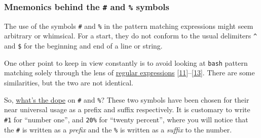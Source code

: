\documentclass[
  a4paper,
]{article}
\newenvironment{Shaded}{\begin{snugshade}}{\end{snugshade}}
\newcommand{\BuiltInTok}[1]{\textcolor[rgb]{0.80,0.80,0.80}{#1}}
\newcommand{\CommentTok}[1]{\textcolor[rgb]{0.50,0.62,0.50}{#1}}
\newcommand{\NormalTok}[1]{\textcolor[rgb]{0.80,0.80,0.80}{#1}}
\newcommand{\OperatorTok}[1]{\textcolor[rgb]{0.94,0.94,0.82}{#1}}
\newcommand{\PreprocessorTok}[1]{\textcolor[rgb]{1.00,0.81,0.69}{\textbf{#1}}}
\newcommand{\StringTok}[1]{\textcolor[rgb]{0.80,0.58,0.58}{#1}}
\newcommand{\VariableTok}[1]{\textcolor[rgb]{0.80,0.80,0.80}{#1}}
\begin{document}
\begin{Shaded}
\end{Shaded}

\hypertarget{mnemonics-behind-the-and-symbols}{%
\subsubsection{\texorpdfstring{Mnemonics behind the \texttt{\#} and
\texttt{\%}
symbols}{Mnemonics behind the \# and \% symbols}}\label{mnemonics-behind-the-and-symbols}}

The use of the symbols \texttt{\#} and \texttt{\%} in the pattern
matching expressions might seem arbitrary or whimsical. For a start,
they do not conform to the usual delimiters \texttt{\^{}} and
\texttt{\$} for the beginning and end of a line or string.

One other point to keep in view constantly is to avoid looking at
\texttt{bash} pattern matching solely through the lens of
\href{https://www.regular-expressions.info/tutorial.html}{regular
expressions}
\protect\hyperlink{ref-posixcharclass}{{[}11{]}}--\protect\hyperlink{ref-writeregexp}{{[}13{]}}.
There are some similarities, but the two are not identical.

So,
\href{https://www.ldoceonline.com/dictionary/the-dope-on-somebody-something}{what's
the dope} on \texttt{\#} and \texttt{\%}? These two symbols have been
chosen for their near universal usage as a prefix and suffix
respectively. It is customary to write \texttt{\#1} for ``number one'',
and \texttt{20\%} for ``twenty percent'', where you will notice that the
\texttt{\#} is written as a \emph{prefix} and the \texttt{\%} is written
as a \emph{suffix} to the number.
\end{document}
